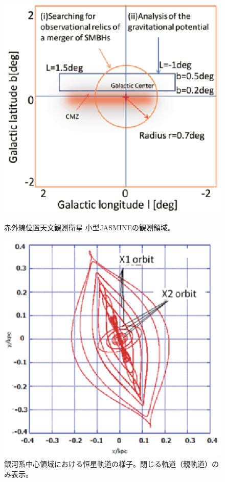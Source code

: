 \begin{figure}[t]
\begin{minipage}{7.8cm}
\includegraphics[width=1.0\linewidth]{astrometry/JASMINE_field_lb.eps}
\vspace{-7mm}
\caption{赤外線位置天文観測衛星 小型JASMINEの観測領域。}
\label{c7.s4.f14}
\end{minipage}
\hspace{4mm}
\begin{minipage}{7.8cm}
\includegraphics[width=1.0\linewidth]{astrometry/JASMINE_field_xy.eps}
\vspace{-9mm}
\caption{銀河系中心領域における恒星軌道の様子。閉じる軌道（親軌道）のみ表示。}
\label{c7.s4.f15}
\end{minipage}
\end{figure}

